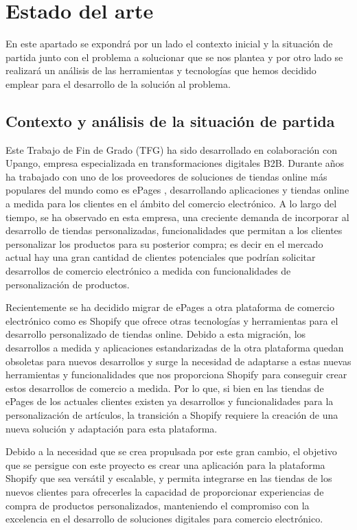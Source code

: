 \documentclass[12pt]{article}
\begin{document}
\newpage
\section{Estado del arte}
En este apartado se expondrá por un lado el contexto inicial y la situación de partida junto con el problema a solucionar que se nos plantea y por 
otro lado se realizará un análisis de las herramientas y tecnologías que hemos decidido emplear para el desarrollo de la solución al problema.
\subsection{Contexto y análisis de la situación de partida}
Este Trabajo de Fin de Grado (TFG) ha sido desarrollado en colaboración con Upango, empresa especializada en transformaciones digitales B2B.
Durante años ha trabajado con uno de los proveedores de soluciones de tiendas online más populares del mundo como es ePages \cite{epages},
desarrollando aplicaciones y tiendas online a medida para los clientes en el ámbito del comercio electrónico. A lo largo del tiempo,
se ha observado en esta empresa, una creciente demanda de incorporar al desarrollo de tiendas personalizadas, funcionalidades que permitan a los clientes
personalizar los productos para su posterior compra; es decir en el mercado actual hay una gran cantidad de clientes potenciales que podrían solicitar desarrollos de comercio
electrónico a medida con funcionalidades de personalización de productos.

Recientemente se ha decidido migrar de ePages a otra plataforma de comercio electrónico como es Shopify\cite{shopify} que ofrece otras tecnologías y herramientas
para el desarrollo personalizado de tiendas online. Debido a esta migración, los desarrollos a medida y aplicaciones estandarizadas de la otra plataforma quedan obsoletas para nuevos desarrollos
y surge la necesidad de adaptarse a estas nuevas herramientas y funcionalidades que nos proporciona Shopify para conseguir crear estos desarrollos de comercio a medida. Por lo que, si
bien en las tiendas de ePages de los actuales clientes existen ya desarrollos y funcionalidades para la personalización de artículos, la transición a Shopify requiere la creación de
una nueva solución y adaptación para esta plataforma.

Debido a la necesidad que se crea propulsada por este gran cambio, el objetivo que se persigue con este proyecto es crear una aplicación para la plataforma Shopify que sea versátil y escalable,
y permita integrarse en las tiendas de los nuevos clientes para ofrecerles la capacidad de proporcionar experiencias de compra de productos personalizados,
manteniendo el compromiso con la excelencia en el desarrollo de soluciones digitales para comercio electrónico.
\end{document}
